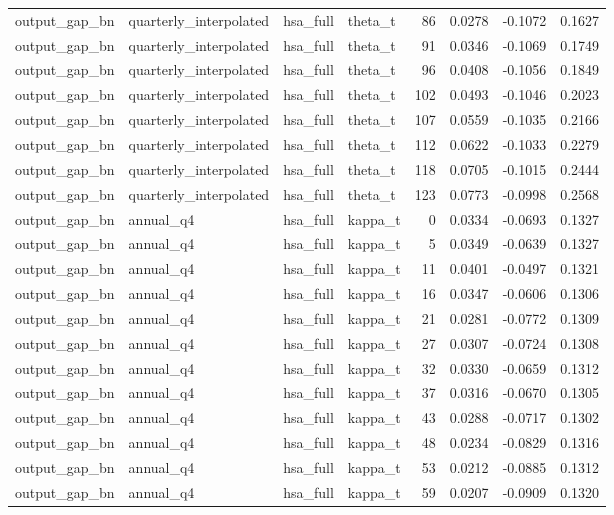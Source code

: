\begin{tabular}{llllrrrr}
output\_gap\_bn & quarterly\_interpolated & hsa\_full & theta\_t & 86 & 0.0278 & -0.1072 & 0.1627 \\
output\_gap\_bn & quarterly\_interpolated & hsa\_full & theta\_t & 91 & 0.0346 & -0.1069 & 0.1749 \\
output\_gap\_bn & quarterly\_interpolated & hsa\_full & theta\_t & 96 & 0.0408 & -0.1056 & 0.1849 \\
output\_gap\_bn & quarterly\_interpolated & hsa\_full & theta\_t & 102 & 0.0493 & -0.1046 & 0.2023 \\
output\_gap\_bn & quarterly\_interpolated & hsa\_full & theta\_t & 107 & 0.0559 & -0.1035 & 0.2166 \\
output\_gap\_bn & quarterly\_interpolated & hsa\_full & theta\_t & 112 & 0.0622 & -0.1033 & 0.2279 \\
output\_gap\_bn & quarterly\_interpolated & hsa\_full & theta\_t & 118 & 0.0705 & -0.1015 & 0.2444 \\
output\_gap\_bn & quarterly\_interpolated & hsa\_full & theta\_t & 123 & 0.0773 & -0.0998 & 0.2568 \\
output\_gap\_bn & annual\_q4 & hsa\_full & kappa\_t & 0 & 0.0334 & -0.0693 & 0.1327 \\
output\_gap\_bn & annual\_q4 & hsa\_full & kappa\_t & 5 & 0.0349 & -0.0639 & 0.1327 \\
output\_gap\_bn & annual\_q4 & hsa\_full & kappa\_t & 11 & 0.0401 & -0.0497 & 0.1321 \\
output\_gap\_bn & annual\_q4 & hsa\_full & kappa\_t & 16 & 0.0347 & -0.0606 & 0.1306 \\
output\_gap\_bn & annual\_q4 & hsa\_full & kappa\_t & 21 & 0.0281 & -0.0772 & 0.1309 \\
output\_gap\_bn & annual\_q4 & hsa\_full & kappa\_t & 27 & 0.0307 & -0.0724 & 0.1308 \\
output\_gap\_bn & annual\_q4 & hsa\_full & kappa\_t & 32 & 0.0330 & -0.0659 & 0.1312 \\
output\_gap\_bn & annual\_q4 & hsa\_full & kappa\_t & 37 & 0.0316 & -0.0670 & 0.1305 \\
output\_gap\_bn & annual\_q4 & hsa\_full & kappa\_t & 43 & 0.0288 & -0.0717 & 0.1302 \\
output\_gap\_bn & annual\_q4 & hsa\_full & kappa\_t & 48 & 0.0234 & -0.0829 & 0.1316 \\
output\_gap\_bn & annual\_q4 & hsa\_full & kappa\_t & 53 & 0.0212 & -0.0885 & 0.1312 \\
output\_gap\_bn & annual\_q4 & hsa\_full & kappa\_t & 59 & 0.0207 & -0.0909 & 0.1320 \\

\end{tabular}
